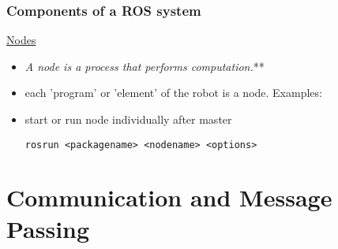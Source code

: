 \documentclass[fleqn]{beamer} %
\newcommand{\sectiontitleI}{Components of a ROS system} %
\newcommand{\sectiontitleII}{Communication and Message Passing}
\begin{document}
	\begin{frame}[containsverbatim] \small
		\frametitle{\sectiontitleI}
\href{http://wiki.ros.org/Nodes}{Nodes}             
                \begin{itemize}
                    \item {\it A node is a process that performs computation.}** 
                    \item each 'program' or 'element' of the robot is a node. Examples:
                        \begin{itemize} 
                        \end{itemize}
                    \item start or run node individually after master\vspace{5mm}\\
                    \begin{lstlisting}
rosrun <packagename> <nodename> <options> 
                    \end{lstlisting} 
                    
                  
                                      
                \end{itemize}
	\end{frame}

\section{\sectiontitleII}
\end{document}
